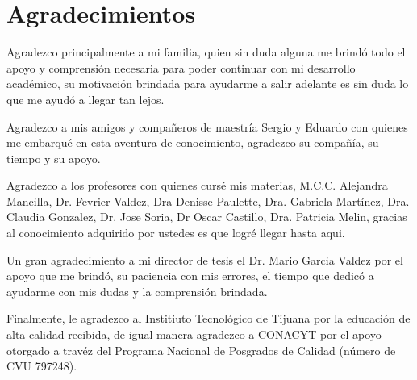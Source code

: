 \clearpage

\section*{Agradecimientos}

Agradezco principalmente a mi familia, quien sin duda alguna me brindó todo el
apoyo y comprensión necesaria para poder continuar con mi desarrollo académico,
su motivación brindada para ayudarme a salir adelante es sin duda lo que me
ayudó a llegar tan lejos.

Agradezco a mis amigos y compañeros de maestría Sergio y Eduardo con quienes me
embarqué en esta aventura de conocimiento, agradezco su compañía, su tiempo y su
apoyo.

Agradezco a los profesores con quienes cursé mis materias, M.C.C. Alejandra
Mancilla, Dr. Fevrier Valdez, Dra Denisse Paulette, Dra. Gabriela Martínez,
Dra. Claudia Gonzalez, Dr. Jose Soria, Dr Oscar Castillo, Dra. Patricia Melin,
gracias al conocimiento adquirido por ustedes es que logré llegar hasta aqui.

Un gran agradecimiento a mi director de tesis el Dr. Mario Garcia Valdez por el
apoyo que me brindó, su paciencia con mis errores, el tiempo que dedicó a
ayudarme con mis dudas y la comprensión brindada.

Finalmente, le agradezco al Institiuto Tecnológico de Tijuana por la educación de
alta calidad recibida, de igual manera agradezco a CONACYT por el apoyo otorgado
a travéz del Programa Nacional de Posgrados de Calidad (número de CVU 797248).


